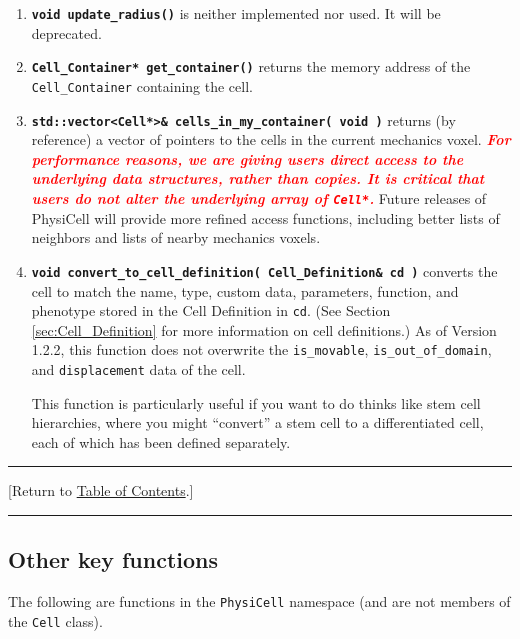 \documentclass[12pt]{article}
\renewcommand{\v}{\verb}
\newcommand{\smallcode}[1]{\textbf{\texttt{#1}}}
\newcommand{\red}[1]{\textcolor{red}{#1}}
\newcommand{\TOClink}{\begin{center}\hrule\vskip-10pt\phantom{.}\hfill[Return to \hyperlink{TOC}{Table of Contents}.]\hfill\phantom{.}\vskip3pt\hrule\end{center}}
\begin{document}
\begin{enumerate}
\item 
\smallcode{void update\_radius()} is neither implemented nor used. It will 
be deprecated. 

\item 
\smallcode{Cell\_Container* get\_container()} returns the memory 
address of the \v|Cell_Container| containing the cell. 

\item 
\smallcode{std::vector<Cell*>\& cells\_in\_my\_container( void )} returns (by reference) 
a vector of pointers to the cells in the current mechanics voxel. 
\red{\textbf{\emph{For performance reasons, we are giving users direct access to the underlying 
data structures, rather than copies. It is critical that users do not alter the underlying 
array of \texttt{Cell*}.}}} Future releases of PhysiCell will provide more refined 
access functions, including better lists of neighbors and lists of 
nearby mechanics voxels. 

\item 
\smallcode{void convert\_to\_cell\_definition( Cell\_Definition\& cd )} converts 
the cell to match the name, type, custom data, parameters, function, and phenotype 
stored in the Cell Definition in \verb+cd+. (See Section \ref{sec:Cell_Definition} for more 
information on cell definitions.) As of Version 1.2.2, this function does not overwrite 
the \v|is_movable|, \v|is_out_of_domain|, and \v|displacement| data of the cell. 

This function is particularly useful if you want to do thinks like stem cell hierarchies, where you 
might ``convert'' a stem cell to a differentiated cell, each of which has been defined 
separately. 

\end{enumerate} 

\TOClink 

\subsection{Other key functions}
\label{sec:other_key_cell_functions}
The following are functions in the \v|PhysiCell| namespace 
(and are not members of the \v|Cell| class). 
\end{document}
